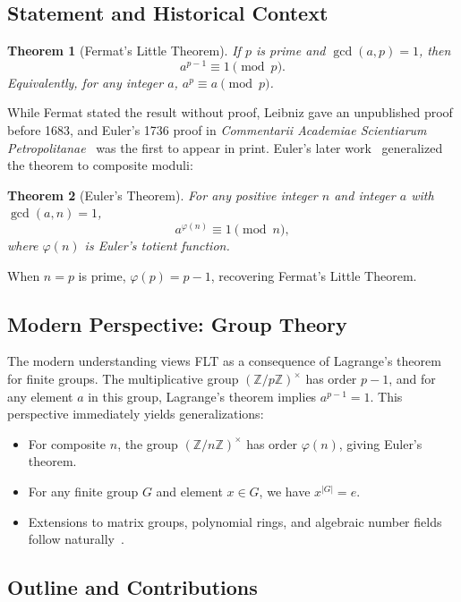 \documentclass{amsart}
\theoremstyle{plain}
\newtheorem{theorem}{Theorem}[section]
\theoremstyle{definition}
\theoremstyle{remark}
\newcommand{\Z}{\mathbb{Z}}
\begin{document}
\subsection{Statement and Historical Context}

\begin{theorem}[Fermat's Little Theorem]\label{thm:flt}
If $p$ is prime and $\gcd(a, p) = 1$, then
\[
a^{p-1} \equiv 1 \pmod{p}.
\]
Equivalently, for any integer $a$, $a^p \equiv a \pmod{p}$.
\end{theorem}

While Fermat stated the result without proof, Leibniz gave an unpublished proof before 1683, and Euler's 1736 proof in \emph{Commentarii Academiae Scientiarum Petropolitanae}~\cite{euler1736} was the first to appear in print. Euler's later work~\cite{euler1763} generalized the theorem to composite moduli:

\begin{theorem}[Euler's Theorem]\label{thm:euler}
For any positive integer $n$ and integer $a$ with $\gcd(a,n) = 1$,
\[
a^{\varphi(n)} \equiv 1 \pmod{n},
\]
where $\varphi(n)$ is Euler's totient function.
\end{theorem}

When $n = p$ is prime, $\varphi(p) = p-1$, recovering Fermat's Little Theorem.

\subsection{Modern Perspective: Group Theory}

The modern understanding views FLT as a consequence of Lagrange's theorem for finite groups. The multiplicative group $(\Z/p\Z)^\times$ has order $p-1$, and for any element $a$ in this group, Lagrange's theorem implies $a^{p-1} = 1$. This perspective immediately yields generalizations:
\begin{itemize}
\item For composite $n$, the group $(\Z/n\Z)^\times$ has order $\varphi(n)$, giving Euler's theorem.
\item For any finite group $G$ and element $x \in G$, we have $x^{|G|} = e$.
\item Extensions to matrix groups, polynomial rings, and algebraic number fields follow naturally~\cite{isaacs_pournaki2005,hernandez2020}.
\end{itemize}

\subsection{Outline and Contributions}
\end{document}
